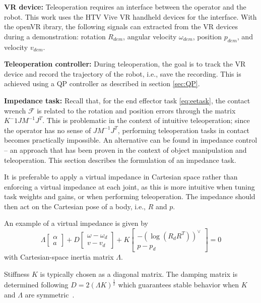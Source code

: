 \documentclass[a4paper, 10pt, conference]{ieeeconf}
\begin{document}
    \textbf{VR device:} Teleoperation requires an interface between the operator and the robot. This work uses the HTV Vive VR handheld devices for the interface. With the openVR ibrary, the following signals can extracted from the VR devices during a demonstration: rotation $R_{dem}$, angular velocity $\omega_{dem}$, position $p_{dem}$, and velocity $v_{dem}$.

    \textbf{Teleoperation controller:}
    During teleoperation, the goal is to track the VR device and record the trajectory of the robot, i.e., save the recording. This is achieved using a QP controller as described in section \ref{sec:QP}.

     \textbf{Impedance task:} Recall that, for the end effector task \eqref{eq:eetask}, the contact wrench $\mathcal{F}$ is related to the rotation and position errors through the matrix $K^-1JM^{-1}J^T$. This is problematic in the context of intuitive teleoperation; since the operator has no sense of $JM^{-1}J^T$, performing teleoperation tasks in contact becomes practically impossible.
     An alternative can be found in impedance control -- an approach that has been proven in the context of object manipulation and teleoperation. This section describes the formulation of an impedance task.

    It is preferable to apply a virtual impedance in Cartesian space rather than enforcing a virtual impedance at each joint, as this is more intuitive when tuning task weights and gains, or when performing teleoperation. The impedance should then act on the Cartesian pose of a body, i.e., $R$ and $p$. 

     An example of a virtual impedance is given by
         \begin{equation} \label{eq:impedance_desired}
     \Lambda  \begin{bmatrix} \alpha   \\ a  \end{bmatrix} + D \begin{bmatrix} \omega - {\omega_d} \\ v - v_d \end{bmatrix}  + K \begin{bmatrix} -(\log({R}_dR^T))^{\vee } \\p - {p_d}  \end{bmatrix} = 0
     \end{equation}
    with Cartesian-space inertia matrix $\Lambda$. 

    Stiffness $K$ is typically chosen as a diagonal matrix. The damping matrix is determined following $D = 2(\Lambda K)^{\frac{1}{2}}$ which guarantees stable behavior when $K$ and $\Lambda$ are symmetric~\cite{albu-schafferCartesianImpedanceControl2003}. 
\end{document}
